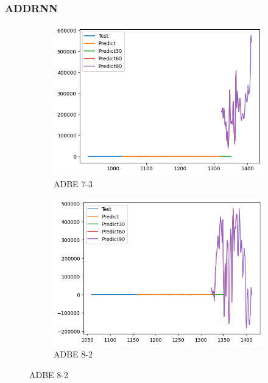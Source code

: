 \documentclass{ieeeojies}
\begin{document}
\subsubsection{ADDRNN}
\begin{figure}[H]
    \centering
    \begin{subfigure}[b]{0.33\linewidth}
        \centering
        \includegraphics[width=\linewidth]{AddRNN Plot/AddRNN_ADBE_7_3.png}
        \caption{ADBE 7-3}
        \label{fig:adbe-7-3}
    \end{subfigure}%
    \hfill
    \begin{subfigure}[b]{0.33\linewidth}
        \centering
        \includegraphics[width=\linewidth]{AddRNN Plot/AddRNN_ADBE_8_2.png}
        \caption{ADBE 8-2}
        \label{fig:adbe-8-2}
    \end{subfigure}%

\end{figure}
\end{document}
